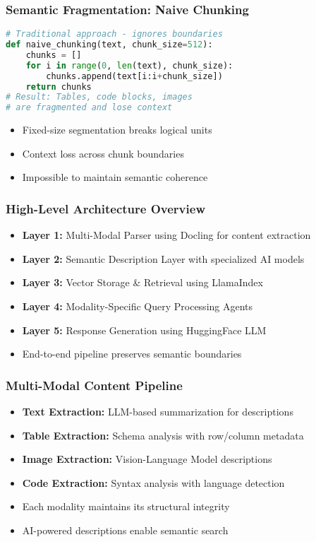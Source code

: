 \begin{frame}[fragile]\frametitle{Semantic Fragmentation: Naive Chunking}
\begin{lstlisting}[language=Python]
# Traditional approach - ignores boundaries
def naive_chunking(text, chunk_size=512):
    chunks = []
    for i in range(0, len(text), chunk_size):
        chunks.append(text[i:i+chunk_size])
    return chunks
# Result: Tables, code blocks, images 
# are fragmented and lose context
\end{lstlisting}
\begin{itemize}
\item Fixed-size segmentation breaks logical units
\item Context loss across chunk boundaries
\item Impossible to maintain semantic coherence
\end{itemize}
\end{frame}

\begin{frame}[fragile]\frametitle{High-Level Architecture Overview}
\begin{itemize}
\item \textbf{Layer 1:} Multi-Modal Parser using Docling for content extraction
\item \textbf{Layer 2:} Semantic Description Layer with specialized AI models
\item \textbf{Layer 3:} Vector Storage \& Retrieval using LlamaIndex
\item \textbf{Layer 4:} Modality-Specific Query Processing Agents
\item \textbf{Layer 5:} Response Generation using HuggingFace LLM
\item End-to-end pipeline preserves semantic boundaries
\end{itemize}
\end{frame}

\begin{frame}[fragile]\frametitle{Multi-Modal Content Pipeline}
\begin{itemize}
\item \textbf{Text Extraction:} LLM-based summarization for descriptions
\item \textbf{Table Extraction:} Schema analysis with row/column metadata
\item \textbf{Image Extraction:} Vision-Language Model descriptions
\item \textbf{Code Extraction:} Syntax analysis with language detection
\item Each modality maintains its structural integrity
\item AI-powered descriptions enable semantic search
\end{itemize}
\end{frame}

